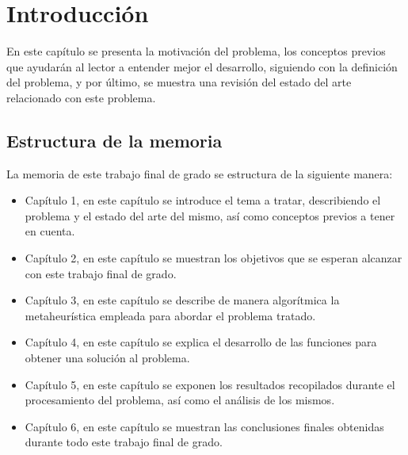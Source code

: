 
\chapter{Introducción} %

\label{Chapter1}


\newcommand{\keyword}[1]{\textbf{#1}}
\newcommand{\tabhead}[1]{\textbf{#1}}
\newcommand{\code}[1]{\texttt{#1}}
\newcommand{\file}[1]{\texttt{\bfseries#1}}
\newcommand{\option}[1]{\texttt{\itshape#1}}
\newcommand{\Mod}[1]{\ (\mathrm{mod}\ #1)}

En este capítulo se presenta la motivación del problema, los conceptos previos que ayudarán al lector a entender mejor el desarrollo, siguiendo con la definición del problema, y por último, se muestra una revisión del estado del arte relacionado con este problema.

\section{Estructura de la memoria}
La memoria de este trabajo final de grado se estructura de la siguiente manera:
\begin{itemize}
	\item Capítulo 1, en este capítulo se introduce el tema a tratar, describiendo el problema y el estado del arte del mismo, así como conceptos previos a tener en cuenta.
	\item Capítulo 2, en este capítulo se muestran los objetivos que se esperan alcanzar con este trabajo final de grado.
	\item Capítulo 3, en este capítulo se describe de manera algorítmica la metaheurística empleada para abordar el problema tratado.
	\item Capítulo 4, en este capítulo se explica el desarrollo de las funciones para obtener una solución al problema.
	\item Capítulo 5, en este capítulo se exponen los resultados recopilados durante el procesamiento del problema, así como el análisis de los mismos.
	\item Capítulo 6, en este capítulo se muestran las conclusiones finales obtenidas durante todo este trabajo final de grado.
\end{itemize}

